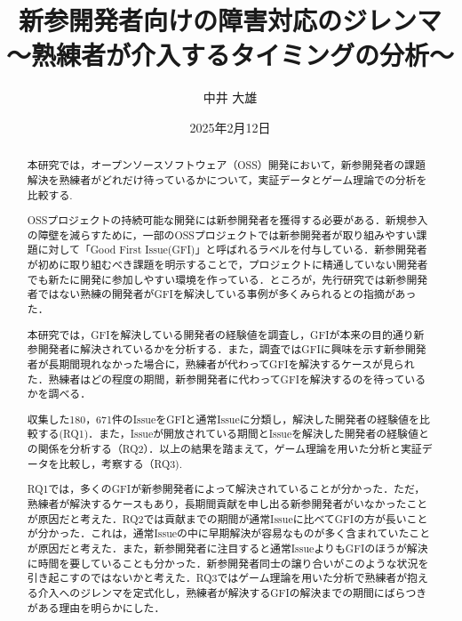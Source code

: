 \documentclass[11pt]{jreport}
\title{新参開発者向けの障害対応のジレンマ\\〜熟練者が介入するタイミングの分析〜}
\author{中井 大雄}
\date{2025年2月12日}	%
\newcommand{\NIssue}{180，671}
\begin{document}
\maketitle

\begin{abstract}
本研究では，オープンソースソフトウェア（OSS）開発において，新参開発者の課題解決を熟練者がどれだけ待っているかについて，実証データとゲーム理論での分析を比較する.

OSSプロジェクトの持続可能な開発には新参開発者を獲得する必要がある．新規参入の障壁を減らすために，一部のOSSプロジェクトでは新参開発者が取り組みやすい課題に対して「Good First Issue(GFI)」と呼ばれるラベルを付与している．新参開発者が初めに取り組むべき課題を明示することで，プロジェクトに精通していない開発者でも新たに開発に参加しやすい環境を作っている．ところが，先行研究では新参開発者ではない熟練の開発者がGFIを解決している事例が多くみられるとの指摘があった．

本研究では，GFIを解決している開発者の経験値を調査し，GFIが本来の目的通り新参開発者に解決されているかを分析する．また，調査ではGFIに興味を示す新参開発者が長期間現れなかった場合に，熟練者が代わってGFIを解決するケースが見られた．熟練者はどの程度の期間，新参開発者に代わってGFIを解決するのを待っているかを調べる．

収集した\NIssue 件のIssueをGFIと通常Issueに分類し，解決した開発者の経験値を比較する(RQ1)．また，Issueが開放されている期間とIssueを解決した開発者の経験値との関係を分析する（RQ2）．以上の結果を踏まえて，ゲーム理論を用いた分析と実証データを比較し，考察する（RQ3).

RQ1では，多くのGFIが新参開発者によって解決されていることが分かった．ただ，熟練者が解決するケースもあり，長期間貢献を申し出る新参開発者がいなかったことが原因だと考えた．RQ2では貢献までの期間が通常Issueに比べてGFIの方が長いことが分かった．これは，通常Issueの中に早期解決が容易なものが多く含まれていたことが原因だと考えた．また，新参開発者に注目すると通常IssueよりもGFIのほうが解決に時間を要していることも分かった．新参開発者同士の譲り合いがこのような状況を引き起こすのではないかと考えた．RQ3ではゲーム理論を用いた分析で熟練者が抱える介入へのジレンマを定式化し，熟練者が解決するGFIの解決までの期間にばらつきがある理由を明らかにした．
\end{abstract}

\tableofcontents


\end{document}
